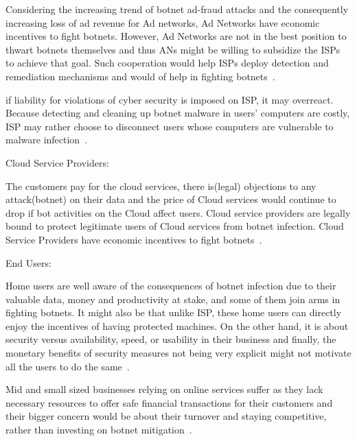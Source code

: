 Considering the increasing trend of botnet ad-fraud attacks and the consequently increasing loss of ad revenue for Ad networks, Ad Networks have economic incentives to fight botnets. However, Ad Networks are not in the best position to thwart botnets themselves and thus ANs might be willing to subsidize the ISPs to achieve that goal. Such cooperation would help ISPs deploy detection and remediation mechanisms and would of help in fighting botnets~\cite{vratonjic2010isps}. 

if liability for violations of cyber security is imposed on ISP, it may overreact. Because detecting and cleaning up botnet malware in users’ computers are costly, ISP may rather choose to disconnect users whose computers are vulnerable to malware infection~\cite{kinukawa2012should}.

Cloud Service Providers:

The customers pay for the cloud services, there is(legal) objections to any attack(botnet) on their data and the price of Cloud services would continue to drop if bot activities on the Cloud affect users. Cloud service providers are legally  bound to protect legitimate users of Cloud services from botnet infection. Cloud Service Providers have economic incentives to fight botnets~\cite{peng2014moving}.

End Users:

Home users are well aware of the consequences of botnet infection due to their valuable data, money and productivity at stake, and some of them join arms in fighting botnets. It might also be that unlike ISP, these home users can directly enjoy the incentives of having protected machines. On the other hand, it is about security versus availability, speed, or usability in their business and finally, the monetary benefits of security measures not being very explicit might not motivate all the users to do the same~\cite{asghari2010botnet}.

Mid and small sized businesses relying on online services suffer as they lack necessary resources to offer safe financial transactions for their customers and their bigger concern would be about their turnover and staying competitive, rather than investing on botnet mitigation~\cite{asghari2010botnet}.


